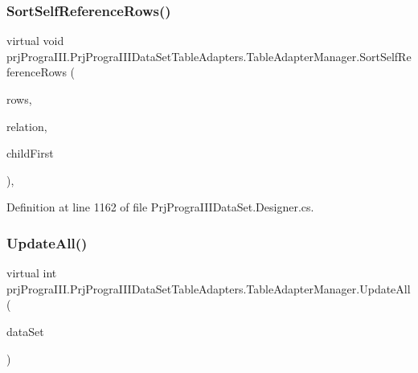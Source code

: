 \subsubsection{\texorpdfstring{Sort\+Self\+Reference\+Rows()}{SortSelfReferenceRows()}}
{\footnotesize\ttfamily virtual void prj\+Progra\+I\+I\+I.\+Prj\+Progra\+I\+I\+I\+Data\+Set\+Table\+Adapters.\+Table\+Adapter\+Manager.\+Sort\+Self\+Reference\+Rows (\begin{DoxyParamCaption}\item[{global\+::\+System.\+Data.\+Data\+Row \mbox{[}$\,$\mbox{]}}]{rows,  }\item[{global\+::\+System.\+Data.\+Data\+Relation}]{relation,  }\item[{bool}]{child\+First }\end{DoxyParamCaption})\hspace{0.3cm}{\ttfamily [protected]}, {\ttfamily [virtual]}}



Definition at line 1162 of file Prj\+Progra\+I\+I\+I\+Data\+Set.\+Designer.\+cs.

\hypertarget{classprj_progra_i_i_i_1_1_prj_progra_i_i_i_data_set_table_adapters_1_1_table_adapter_manager_afa01f84fa5f134c63c7eb3e08a8da05d}{}\label{classprj_progra_i_i_i_1_1_prj_progra_i_i_i_data_set_table_adapters_1_1_table_adapter_manager_afa01f84fa5f134c63c7eb3e08a8da05d} 
\subsubsection{\texorpdfstring{Update\+All()}{UpdateAll()}}
{\footnotesize\ttfamily virtual int prj\+Progra\+I\+I\+I.\+Prj\+Progra\+I\+I\+I\+Data\+Set\+Table\+Adapters.\+Table\+Adapter\+Manager.\+Update\+All (\begin{DoxyParamCaption}\item[{\hyperlink{classprj_progra_i_i_i_1_1_prj_progra_i_i_i_data_set}{Prj\+Progra\+I\+I\+I\+Data\+Set}}]{data\+Set }\end{DoxyParamCaption})\hspace{0.3cm}{\ttfamily [virtual]}}



